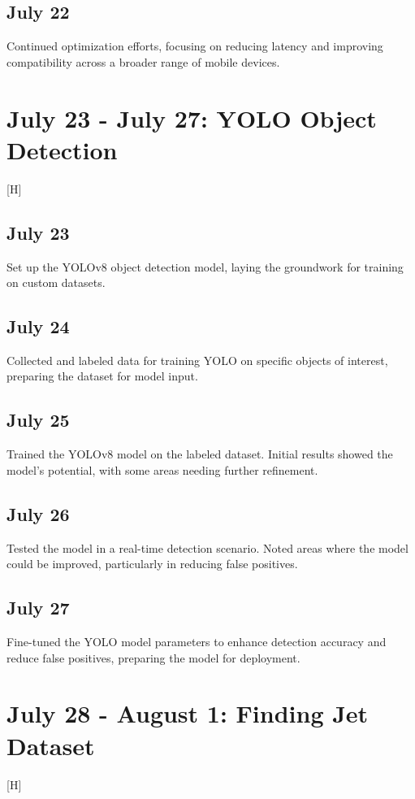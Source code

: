 \documentclass{report}
\begin{document}
\subsection*{July 22}
Continued optimization efforts, focusing on reducing latency and improving compatibility across a broader range of mobile devices.

\section{July 23 - July 27: YOLO Object Detection}[H]

\subsection*{July 23}
Set up the YOLOv8 object detection model, laying the groundwork for training on custom datasets.

\subsection*{July 24}
Collected and labeled data for training YOLO on specific objects of interest, preparing the dataset for model input.

\subsection*{July 25}
Trained the YOLOv8 model on the labeled dataset. Initial results showed the model’s potential, with some areas needing further refinement.

\subsection*{July 26}
Tested the model in a real-time detection scenario. Noted areas where the model could be improved, particularly in reducing false positives.

\subsection*{July 27}
Fine-tuned the YOLO model parameters to enhance detection accuracy and reduce false positives, preparing the model for deployment.

\section{July 28 - August 1: Finding Jet Dataset}[H]
\end{document}
